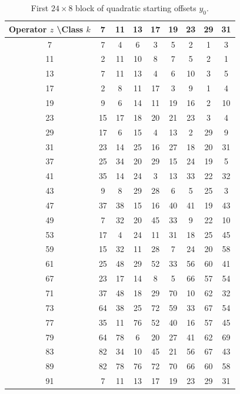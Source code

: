 \documentclass[11pt,a4paper]{article}
\begin{document}
\begin{table}[htbp]
\centering
\tiny
\begin{tabular}{c|cccccccc}
Operator \(z\) \textbackslash Class \(k\) & 7 & 11 & 13 & 17 & 19 & 23 & 29 & 31 \\
\hline
7  & 7 & 4 & 6 & 3 & 5 & 2 & 1 & 3 \\
11 & 2 & 11 & 10 & 8 & 7 & 5 & 2 & 1 \\
13 & 7 & 11 & 13 & 4 & 6 & 10 & 3 & 5 \\
17 & 2 & 8 & 11 & 17 & 3 & 9 & 1 & 4 \\
19 & 9 & 6 & 14 & 11 & 19 & 16 & 2 & 10 \\
23 & 15 & 17 & 18 & 20 & 21 & 23 & 3 & 4 \\
29 & 17 & 6 & 15 & 4 & 13 & 2 & 29 & 9 \\
31 & 23 & 14 & 25 & 16 & 27 & 18 & 20 & 31 \\
37 & 25 & 34 & 20 & 29 & 15 & 24 & 19 & 5 \\
41 & 35 & 14 & 24 & 3 & 13 & 33 & 22 & 32 \\
43 & 9 & 8 & 29 & 28 & 6 & 5 & 25 & 3 \\
47 & 37 & 38 & 15 & 16 & 40 & 41 & 19 & 43 \\
49 & 7 & 32 & 20 & 45 & 33 & 9 & 22 & 10 \\
53 & 17 & 4 & 24 & 11 & 31 & 18 & 25 & 45 \\
59 & 15 & 32 & 11 & 28 & 7 & 24 & 20 & 58 \\
61 & 25 & 48 & 29 & 52 & 33 & 56 & 60 & 41 \\
67 & 23 & 17 & 14 & 8 & 5 & 66 & 57 & 54 \\
71 & 37 & 48 & 18 & 29 & 70 & 10 & 62 & 32 \\
73 & 64 & 38 & 25 & 72 & 59 & 33 & 67 & 54 \\
77 & 35 & 11 & 76 & 52 & 40 & 16 & 57 & 45 \\
79 & 64 & 78 & 6 & 20 & 27 & 41 & 62 & 69 \\
83 & 82 & 34 & 10 & 45 & 21 & 56 & 67 & 43 \\
89 & 82 & 78 & 76 & 72 & 70 & 66 & 60 & 58 \\
91 & 7 & 11 & 13 & 17 & 19 & 23 & 29 & 31 \\
\end{tabular}
\caption{First \(24 \times 8\) block of quadratic starting offsets \(y_0\).}
\label{tab:y0-block1}
\end{table}
\end{document}

